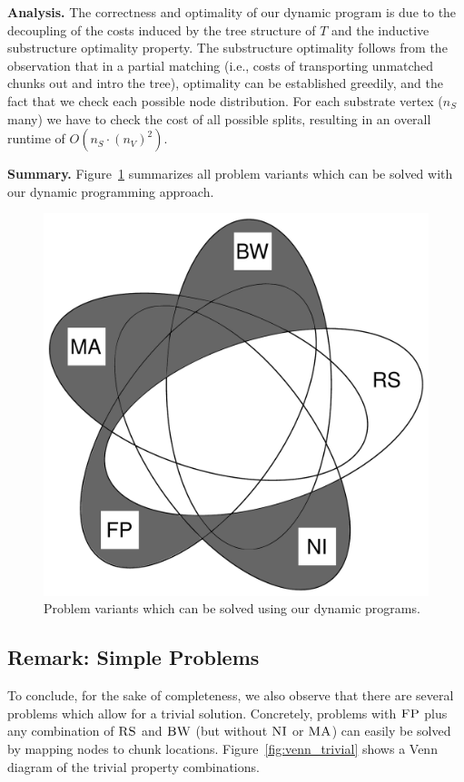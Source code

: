 \documentclass[9pt,twocolumn]{scrartcl}
\newcommand{\CC}{\textsc{NI}}
\newcommand{\FP}{\textsc{FP}}
\newcommand{\RS}{\textsc{RS}}
\newcommand{\BW}{\textsc{BW}}
\newcommand{\MA}{\textsc{MA}}
\newcommand{\Tree}{\ensuremath{T}}
\begin{document}
\textbf{Analysis.}
The correctness and optimality of our dynamic program 
is due to the decoupling of the costs induced by the tree
structure of $\Tree$ and the inductive substructure
optimality property. 
The substructure optimality follows from the observation that 
in a partial matching (i.e., costs of transporting unmatched
chunks out and intro the tree), 
optimality can be established greedily, and the fact
 that we check each possible node distribution. 
For each substrate vertex ($n_S$ many) we have 
to check the cost of all possible splits, 
resulting in an overall runtime of $O(n_S \cdot (n_V)^2)$.


\textbf{Summary.}
Figure~\ref{fig:venn_dp} summarizes all problem
variants which can be solved with our dynamic programming approach.
\begin{figure}
\includegraphics[width=\columnwidth]{figs/venn_dp.pdf}
\caption{Problem variants which can be solved using our dynamic programs.}
\label{fig:venn_dp}
\end{figure}

\subsection{Remark: Simple Problems}

To conclude, for the sake of completeness, we also observe that there are
several problems which
allow for a trivial solution. Concretely, problems with $\FP$
plus any combination of
$\RS$ and $\BW$ (but without $\CC$ or $\MA$) can easily be solved by mapping nodes to chunk locations.
Figure~\ref{fig:venn_trivial}
shows a Venn diagram of the trivial property combinations.
\end{document}
